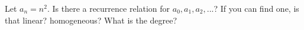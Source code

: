 Let $a_n = n^2$.
Is there a recurrence relation for $a_0, a_1, a_2, ...$?
If you can find one, is that linear? homogeneous? What is the degree?

